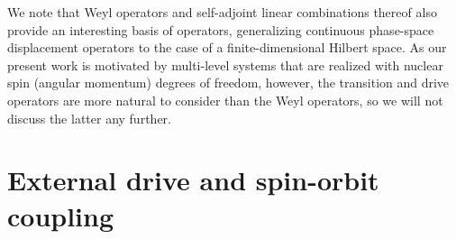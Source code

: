 \documentclass[nofootinbib,notitlepage,11pt]{revtex4-2}
\newcommand{\1}{\mathds{1}}
\begin{document}
We note that Weyl operators\cite{bertlmann2008bloch} and self-adjoint
linear combinations thereof\cite{asadian2016heisenbergweyl} also
provide an interesting basis of operators, generalizing continuous
phase-space displacement operators to the case of a finite-dimensional
Hilbert space.  As our present work is motivated by multi-level
systems that are realized with nuclear spin (angular momentum) degrees
of freedom, however, the transition and drive operators are more
natural to consider than the Weyl operators, so we will not discuss
the latter any further.

\section{External drive and spin-orbit coupling}
\label{sec:drive_SOC}
\end{document}
